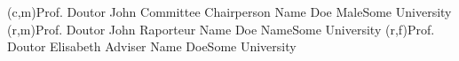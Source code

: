 \ncmember(c,m){Prof. Doutor John Committee Chairperson Name Doe Male}{Some University}
\ncmember(r,m){Prof. Doutor John Raporteur Name Doe Name}{Some University}
\ncmember(r,f){Prof. Doutor Elisabeth Adviser Name Doe}{Some University}




